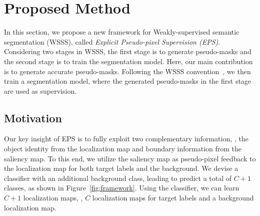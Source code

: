 \documentclass[final]{cvpr}
\begin{document}
\section{Proposed Method}

In this section, we propose a new framework for Weakly-supervised semantic segmentation (WSSS), called \emph{Explicit Pseudo-pixel Supervision (EPS)}. Considering two stages in WSSS, the first stage is to generate pseudo-masks and the second stage is to train the segmentation model. Here, our main contribution is to generate accurate pseudo-masks. Following the WSSS convention~\cite{fan2020learning,jiang2019integral,lee2019ficklenet,li2018tell,wang2020self,wei2017object}, we then train a segmentation model, where the generated pseudo-masks in the first stage are used as supervision.




\subsection{Motivation}
\label{section3.1}


Our key insight of EPS is to fully exploit two complementary information, \ie, the object identity from the localization map and boundary information from the saliency map. To this end, we utilize the saliency map as pseudo-pixel feedback to the localization map for both target labels and the background. We devise a classifier with an additional background class, leading to predict a total of $C+1$ classes, as shown in Figure~\ref{fig:framework}. Using the classifier, we can learn $C+1$ localization maps, \ie, $C$ localization maps for target labels and a background localization map.
\end{document}
